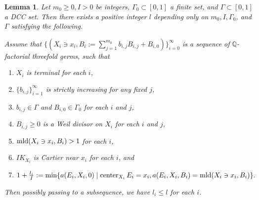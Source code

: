 \documentclass[11pt]{amsart}
\numberwithin{equation}{section}
\newcommand{\Qq}{\mathbb{Q}}
\newcommand{\Center}{\operatorname{center}}
\newcommand{\mld}{{\rm{mld}}}
\newcommand{\Ii}{{\Gamma}}
\newtheorem{lem}[thm]{Lemma}
\theoremstyle{definition}
\theoremstyle{definition}
\begin{document}
\begin{lem}\label{lem: detailed lemma for dcc uniform bdd}
Let $m_0\geq 0, I>0$ be integers, $\Ii_0\subset [0,1]$ a finite set, and $\Ii\subset [0,1]$ a DCC set. Then there exists a positive integer $l$ depending only on $m_0,I,\Ii_0$, and $\Ii$ satisfying the following.

Assume that $\{(X_i\ni x_i,B_i:=\sum_{j=1}^{m_0}b_{i,j}B_{i,j}+B_{i,0})\}_{i=0}^{\infty}$ is a sequence of $\Qq$-factorial threefold germs, such that
\begin{enumerate}
\item $X_i$ is terminal for each $i$,
\item $\{b_{i,j}\}_{i=1}^{\infty}$ is strictly increasing for any fixed $j$, 
\item $b_{i,j}\in\Ii$ and  $B_{i,0}\in\Ii_0$ for each $i$ and $j$,
\item $B_{i,j}\geq 0$ is a Weil divisor on $X_i$ for each $i$ and $j$,
\item $\mld(X_i\ni x_i,B_i)> 1$ for each $i$,
\item $IK_{X_i}$ is Cartier near $x_i$ for each $i$, and
\item $1+\frac{l_i}{I}:=\min\{a(E_i,X_i,0)\mid \Center_{X_i}E_i=x_i,a(E_i,X_i,B_i)=\mld(X_i\ni x_i,B_i)\}.$
\end{enumerate}
Then possibly passing to a subsequence, we have $l_i\leq l$ for each $i$.
\end{lem}
\end{document}
